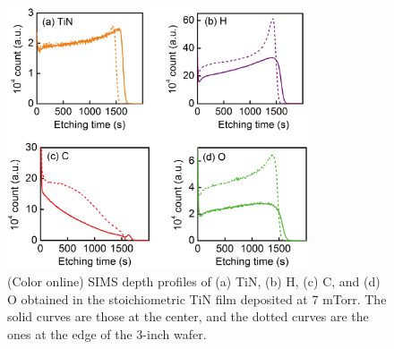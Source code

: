 \begin{figure}
\begin{center}
\includegraphics[width=89mm]{InPlaneDist-SIMS.jpg}
\end{center}
\caption{(Color online) SIMS depth profiles of (a) TiN, (b) H, (c) C, and (d) O obtained in the stoichiometric TiN film deposited at 7 mTorr. The solid curves are those at the center, and the dotted curves are the ones at the edge of the 3-inch wafer.}
\label{InPlaneDist-SIMS}
\end{figure}

